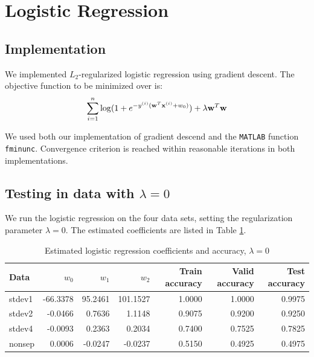 
\section{Logistic Regression}\label{sec:lr}

\subsection{Implementation}
We implemented $L_2$-regularized logistic regression using gradient descent. The objective function to be minimized over is:
\begin{equation}
\sum_{i=1}^n \log (1 + e^{-y^{(i)}(\boldsymbol{\mathbf{w}}^T\boldsymbol{\mathbf{x}}^{(i)} + w_0)}) + \lambda \boldsymbol{\mathbf{w}}^T\boldsymbol{\mathbf{w}}
\end{equation}

We used both our implementation of gradient descend and the \texttt{MATLAB} function \texttt{fminunc}. Convergence criterion is reached within reasonable iterations in both implementations.

\subsection{Testing in data with $\lambda = 0$}
We run the logistic regression on the four data sets, setting the regularization parameter $\lambda = 0$. The estimated coefficients are listed in Table \ref{tab:LR_reg_coeff}.

\begin{table}[h!]
\centering
\caption{Estimated logistic regression coefficients and accuracy, $\lambda = 0$ }
\begin{tabular}{lrrrrrr}
  \hline\hline
  Data   & $w_0$ 	& $w_1$ 	  & $w_2$ 	& Train accuracy & Valid accuracy & Test accuracy\\
  \hline
  stdev1 & -66.3378  & 95.2461 & 101.1527 & 1.0000    & 1.0000    & 0.9975\\
  stdev2 & -0.0466   & 0.7636  & 1.1148 	& 0.9075    & 0.9200    & 0.9250\\
  stdev4 & -0.0093   & 0.2363  & 0.2034 	& 0.7400    & 0.7525    & 0.7825\\
  nonsep & 0.0006    & -0.0247 & -0.0237	& 0.5150    & 0.4925	   & 0.4975\\
  \hline\hline
\end{tabular}\label{tab:LR_reg_coeff}
\end{table}

